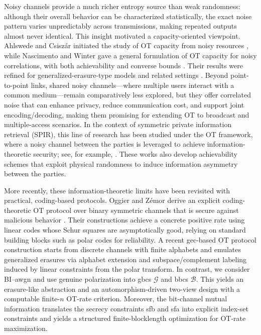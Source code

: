 \documentclass[onecolumn]{IEEEtran} %
\newcommand{\1}{\mathbbm{1}}
\theoremstyle{boldremark}
\begin{document}
Noisy channels provide a much richer entropy source than weak randomness: although their overall behavior can be characterized statistically, the exact noise pattern varies unpredictably across transmissions, making repeated outputs almost never identical. This insight motivated a capacity-oriented viewpoint. Ahlswede and Csisz{\'a}r initiated the study of OT capacity from noisy resources \cite{AhlswedeCsiszar2009}, while Nascimento and Winter gave a general formulation of OT capacity for noisy correlations, with both achievability and converse bounds \cite{NascimentoWinter2006,NascimentoWinter2008}. Their results were refined for generalized-erasure-type models and related settings \cite{AhlswedeCsiszar2013OTCap,ImaiMorozovNascimento2006}. Beyond point-to-point links, shared noisy channels---where multiple users interact with a common medium---remain comparatively less explored, but they offer correlated noise that can enhance privacy, reduce communication cost, and support joint encoding/decoding, making them promising for extending OT to broadcast and multiple-access scenarios. In the context of symmetric private information retrieval (SPIR), this line of research has been studied under the OT framework, where a noisy channel between the parties is leveraged to achieve information-theoretic security; see, for example, \cite{amir1, amir2, amir3}. These works also develop achievability schemes that exploit physical randomness to induce information asymmetry between the parties.

More recently, these information-theoretic limits have been revisited with practical, coding-based protocols. Oggier and Z{\'e}mor derive an explicit coding-theoretic OT protocol over binary symmetric channels that is secure against malicious behavior \cite{OggierZemor22}. Their constructions achieve a concrete positive rate using linear codes whose Schur squares are asymptotically good, relying on standard building blocks such as polar codes for reliability. A recent \gls{gec}-based OT protocol construction \cite{SudaWatanabe25} starts from discrete channels with finite alphabets and emulates generalized
erasures via alphabet extension and subspace/complement labeling induced by linear constraints from the polar
transform. In contrast, we consider BI--\gls{awgn} and use genuine polarization into \gls{gbcs} $\mathcal{G}$ and \gls{bbcs} $\mathcal{B}$. This yields an erasure-like abstraction and an automorphism-driven two-view design with a computable finite-$n$ OT-rate criterion.
Moreover, the bit-channel mutual information translates the secrecy constraints \gls{sfb} and \gls{sfa} into explicit index-set constraints and yields a structured finite-blocklength optimization for OT-rate maximization. 
\end{document}

